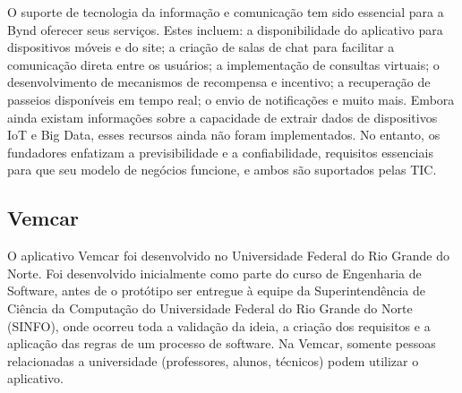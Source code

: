 
O suporte de tecnologia da informação e comunicação tem sido essencial para a Bynd oferecer seus serviços. Estes incluem: a disponibilidade do aplicativo para dispositivos móveis e do site; a criação de salas de chat para facilitar a comunicação direta entre os usuários; a implementação de consultas virtuais; o desenvolvimento de mecanismos de recompensa e incentivo; a recuperação de passeios disponíveis em tempo real; o envio de notificações e muito mais. Embora ainda existam informações sobre a capacidade de extrair dados de dispositivos IoT e Big Data, esses recursos ainda não foram implementados. No entanto, os fundadores enfatizam a previsibilidade e a confiabilidade, requisitos essenciais para que seu modelo de negócios funcione, e ambos são suportados pelas TIC.


\subsection{Vemcar}

O aplicativo Vemcar foi desenvolvido no Universidade Federal do Rio Grande do Norte. Foi desenvolvido inicialmente como parte do curso de Engenharia de Software, antes de o protótipo ser entregue à equipe da Superintendência de Ciência da Computação do Universidade Federal do Rio Grande do Norte (SINFO), onde ocorreu toda a validação da ideia, a criação dos requisitos e a aplicação das regras de um processo de software. Na Vemcar, somente pessoas relacionadas a universidade (professores, alunos, técnicos) podem utilizar o aplicativo.

